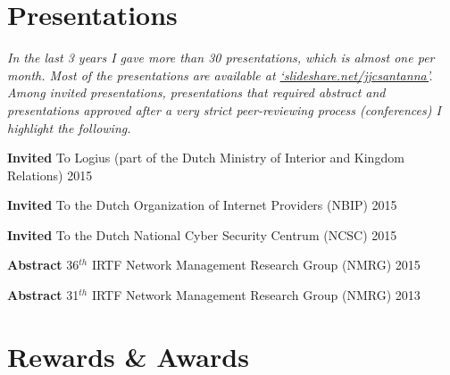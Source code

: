 \documentclass[print]{styles/friggeri-cv-linux} %
\begin{document}
\section{Presentations}\vspace{-5pt}

\textit{In the last 3 years I gave more than 30 presentations, which is almost
one per month. Most of the presentations are available at
\href{http://www.slideshare.net/jjcsantanna}{`slideshare.net/jjcsantanna'}.
Among invited presentations, presentations that required abstract and 
presentations approved after a very strict peer-reviewing process (conferences)
I highlight the following.}

\begin{entrylist}

\vspace{-0.3cm}
\entry
{\textbf{Invited}}
{\textnormal{To Logius (part of the Dutch Ministry of Interior and Kingdom Relations)}}
{2015}

\vspace{-0.3cm}
\entry
{\textbf{Invited}}
{\textnormal{To the Dutch Organization of Internet Providers (NBIP)}}
{2015}

\vspace{-0.3cm}
\entry
{\textbf{Invited}}
{\textnormal{To the Dutch National Cyber Security Centrum (NCSC)}}
{2015}

\vspace{-0.3cm}
\entry
{\textbf{Abstract}}
{\textnormal{36$^{th}$ IRTF Network Management Research Group (NMRG)}}
{2015}

\vspace{-0.3cm}
\entry
{\textbf{Abstract}}
{\textnormal{31$^{th}$ IRTF Network Management Research Group (NMRG)}}
{2013}


\end{entrylist}

\section{Rewards \& Awards}\vspace{-5pt}
\end{document}
